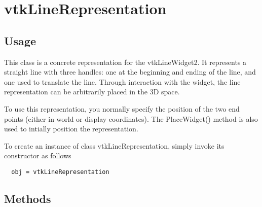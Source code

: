 \section{vtkLineRepresentation}

\subsection{Usage}

 This class is a concrete representation for the vtkLineWidget2. It
 represents a straight line with three handles: one at the beginning and
 ending of the line, and one used to translate the line. Through
 interaction with the widget, the line representation can be arbitrarily
 placed in the 3D space.

 To use this representation, you normally specify the position of the two
 end points (either in world or display coordinates). The PlaceWidget()
 method is also used to intially position the representation.

To create an instance of class vtkLineRepresentation, simply
invoke its constructor as follows
\begin{verbatim}
  obj = vtkLineRepresentation
\end{verbatim}
\subsection{Methods}

